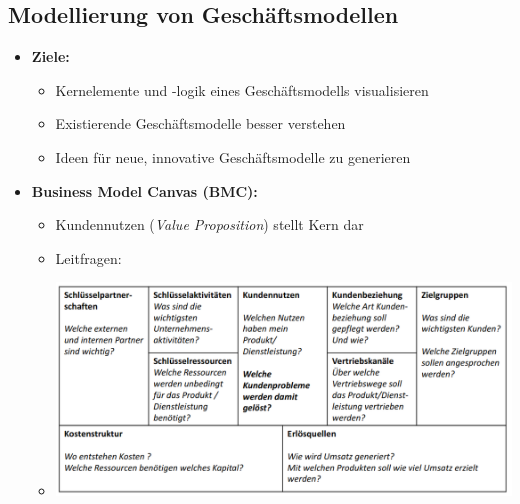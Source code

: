 \documentclass[12pt,a4paper]{article}
\begin{document}
\subsection{Modellierung von Geschäftsmodellen} %
\begin{itemize}
   \item \textbf{Ziele:}
		   \begin{itemize}
				\item Kernelemente und -logik eines Geschäftsmodells visualisieren
				\item Existierende Geschäftsmodelle besser verstehen
				\item Ideen für neue, innovative Geschäftsmodelle zu generieren
			\end{itemize}
	
	
	\newpage
	\item \textbf{Business Model Canvas (BMC):}
	      \begin{itemize}
				\item Kundennutzen (\emph{Value Proposition}) stellt Kern dar
				\item Leitfragen:
				\item[] \includegraphics[scale=0.35]{BMC.png}
			\end{itemize}
	

\end{itemize}
\end{document}
